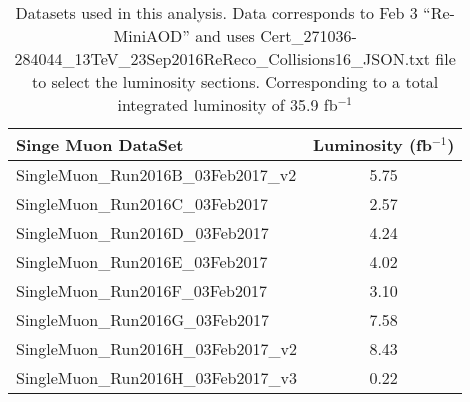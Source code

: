 \documentclass[
10pt, %
a4paper, %
oneside, %
headinclude,footinclude, %
BCOR5mm, %
]{scrartcl}
\begin{document}
\begin{table}[htp]
    \centering
    \label{tab:datasets}

    \caption{ Datasets used in this analysis. Data corresponds to Feb 3 ``Re-MiniAOD'' and uses 
            {\small Cert\_271036-284044\_13TeV\_23Sep2016ReReco\_Collisions16\_JSON.txt} 
            file to select the luminosity sections.
            Corresponding to a total integrated luminosity of 35.9 fb$^{-1}$}
\begin{tabular}{|| l c ||}
    \hline
    \textbf{Singe Muon DataSet}  & \textbf{Luminosity (fb$^{-1}$)}\\
 \hline \hline

%
 SingleMuon\_Run2016B\_03Feb2017\_v2 &   5.75  \\
 SingleMuon\_Run2016C\_03Feb2017   &  2.57 \\
 SingleMuon\_Run2016D\_03Feb2017   & 4.24 \\
 SingleMuon\_Run2016E\_03Feb2017   & 4.02 \\
 SingleMuon\_Run2016F\_03Feb2017   & 3.10 \\
 SingleMuon\_Run2016G\_03Feb2017   & 7.58 \\
 SingleMuon\_Run2016H\_03Feb2017\_v2 & 8.43 \\
 SingleMuon\_Run2016H\_03Feb2017\_v3&  0.22 \\



 \hline

 \end{tabular}

\end{table}
\end{document}
